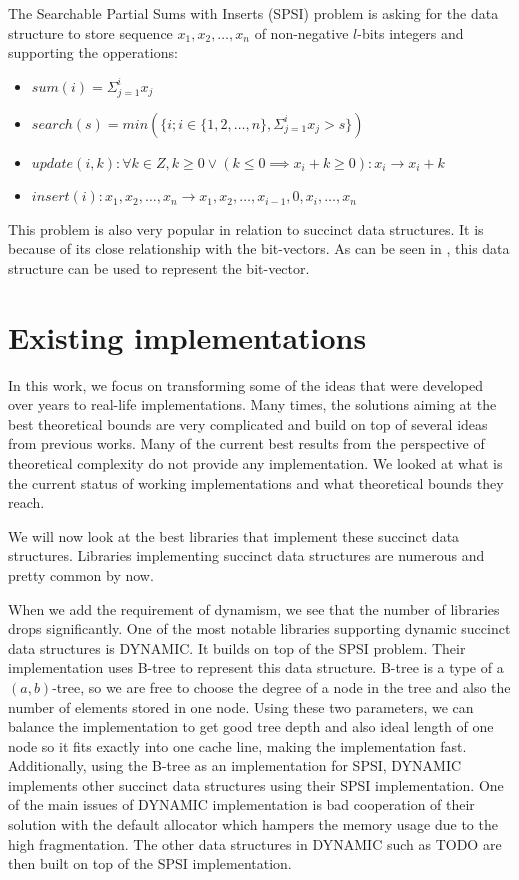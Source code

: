 \begin{theorem}
The Searchable Partial Sums with Inserts (SPSI) problem is asking for the data structure to
store sequence $x_1, x_2, \ldots , x_n$ of non-negative $l$-bits integers and supporting the opperations:
\begin{itemize}
    \item $sum(i) = \Sigma_{j=1}^{i} x_j$
    \item $search(s) = min(\{i; i\in \{1, 2,\ldots, n\}, \Sigma_{j=1}^{i} x_j > s \})$
    \item $update(i, k): \forall k \in Z, k \geq 0 \lor (k\leq 0 \implies x_i + k \geq 0): x_i \rightarrow x_i + k$
    \item $insert(i): x_1, x_2,\ldots, x_n \rightarrow x_1, x_2,\ldots , x_{i-1}, 0, x_{i}, \ldots , x_n$
\end{itemize}
\end{theorem}

This problem is also very popular in relation to succinct data structures. It is because of its close relationship with the bit-vectors.
As can be seen in \cite{prezza2017framework}, this data structure can be used to represent the bit-vector.

\section{Existing implementations}

In this work, we focus on transforming some of the ideas that were developed over years to real-life implementations. Many times, the solutions aiming at the best theoretical bounds are very complicated and build on top of several ideas from previous works. Many of the current best results from the perspective of theoretical complexity do not provide any implementation. We looked at what is the current status of working implementations and what theoretical bounds they reach.

We will now look at the best libraries that implement these succinct data structures. Libraries implementing succinct data structures are numerous and pretty common by now.

When we add the requirement of dynamism, we see that the number of libraries drops significantly. One of the most notable libraries supporting 
dynamic succinct data structures is DYNAMIC. It builds on top of the SPSI problem. Their implementation uses B-tree to represent this data structure. B-tree is a type of a $(a, b)$-tree, so we are free to choose the degree of a node in the tree and also the number of elements stored in one node. Using these two parameters, we can balance the implementation to get good tree depth and also ideal length of one node so it fits exactly into one cache line, making the implementation fast. Additionally, using the B-tree as an implementation for SPSI, DYNAMIC implements other succinct
data structures using their SPSI implementation. One of the main issues of DYNAMIC implementation is bad cooperation of their solution with the default allocator which hampers the memory usage due to the high fragmentation. The other data structures in DYNAMIC such as TODO are then built on top of the SPSI implementation.

